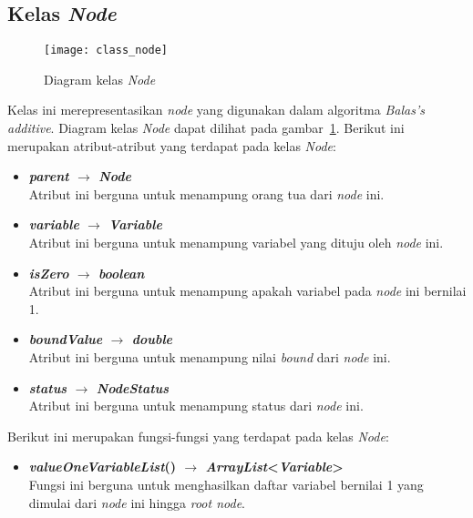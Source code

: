 \subsection{Kelas \textit{Node}}
\begin{figure}[H]
	\centering  
	\texttt{[image: class\_node]}
	\caption[Diagram kelas \textit{Node}]{Diagram kelas \textit{Node}}
	\label{fig:class_node}
\end{figure}
Kelas ini merepresentasikan \textit{node} yang digunakan dalam algoritma \textit{Balas's additive}. Diagram kelas \textit{Node} dapat dilihat pada gambar~\ref{fig:class_node}. Berikut ini merupakan atribut-atribut yang terdapat pada kelas \textit{Node}:
\begin{itemize}
	\item \textbf{\textit{parent} $\rightarrow$ \textit{Node}}\\
	Atribut ini berguna untuk menampung orang tua dari \textit{node} ini.
	\item \textbf{\textit{variable} $\rightarrow$ \textit{Variable}}\\
	Atribut ini berguna untuk menampung variabel yang dituju oleh \textit{node} ini.
	\item \textbf{\textit{isZero} $\rightarrow$ \textit{boolean}}\\
	Atribut ini berguna untuk menampung apakah variabel pada \textit{node} ini bernilai 1.
	\item \textbf{\textit{boundValue} $\rightarrow$ \textit{double}}\\
	Atribut ini berguna untuk menampung nilai \textit{bound} dari \textit{node} ini.
	\item \textbf{\textit{status} $\rightarrow$ \textit{NodeStatus}}\\
	Atribut ini berguna untuk menampung status dari \textit{node} ini.
\end{itemize}
Berikut ini merupakan fungsi-fungsi yang terdapat pada kelas \textit{Node}:
\begin{itemize}
	\item \textbf{\textit{valueOneVariableList}() $\rightarrow$ \textit{ArrayList}<\textit{Variable}>}\\
	Fungsi ini berguna untuk menghasilkan daftar variabel bernilai 1 yang dimulai dari \textit{node} ini hingga \textit{root node}.
\end{itemize}

